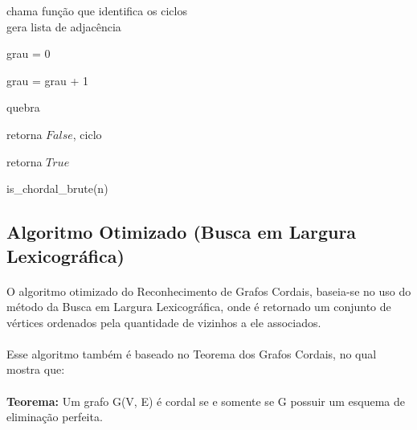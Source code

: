 \documentclass[a4paper, 11pt]{article}
\begin{document}
					\begin{algorithm}[H]
						
						
						chama função que identifica os ciclos\\
						
						gera lista de adjacência\\
						
						{
							{
								grau = 0
								
								{
									{
										grau = grau + 1
									}
								}
								
								{
									quebra
								}
							}
						
							\Else
							{
								retorna $False$, ciclo
							}
						}
					
						retorna $True$
						
						\caption{is\_chordal\_brute(n)}
						
					\end{algorithm}

			
				\subsection{Algoritmo Otimizado (Busca em Largura Lexicográfica)}	
					
					\paragraph{} O algoritmo otimizado do Reconhecimento de Grafos Cordais, baseia-se no uso do método da Busca em Largura Lexicográfica, onde é retornado um conjunto de vértices ordenados pela quantidade de vizinhos a ele associados.
					
					\paragraph{} Esse algoritmo também é baseado no Teorema dos Grafos Cordais, no qual mostra que:
					
					\paragraph{}\textbf{Teorema:} Um grafo G(V, E) é cordal se e somente se G possuir um esquema de eliminação perfeita.
					
\end{document}
